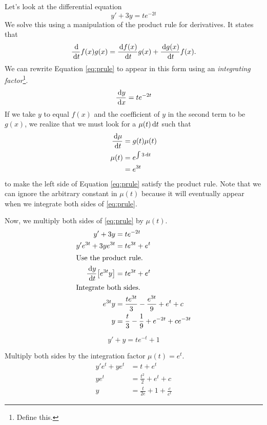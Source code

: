 \begin{ex}
  Let's look at the differential equation
  \begin{equation}
    y'+3y=te^{-2t}
    \label{eq:prule}
  \end{equation}
  We solve this using a manipulation of the product rule for derivatives.
  It states that
  \begin{equation}
    \frac{\,\mathrm{d}}{\,\mathrm{d} t} f(x) g(x)= \frac{\,\mathrm{d} f(x)}{\,\mathrm{d} t} g(x) + \frac{\,\mathrm{d} g(x)}{\,\mathrm{d} t} f(x).
  \end{equation}
  We can rewrite Equation \eqref{eq:prule} to appear in this form using an \emph{integrating factor}\footnote{Define this.}.
  \[ \frac{\,\mathrm{d} y}{\,\mathrm{d} x}= t e^{-2t} \]
  If we take $y$ to equal $f(x)$ and the coefficient of $y$ in the second term to be $g(x)$, we realize that we must look for a $\mu (t) \,\mathrm{d} t$ such that
  \begin{align*}
    \frac{\,\mathrm{d} \mu}{\,\mathrm{d} t} &= g(t) \mu(t) \\
    \mu (t) &= e^{\int 3 \,\mathrm{d} t}\\
    &=e^{3t}
  \end{align*}
  to make the left side of Equation \eqref{eq:prule} satisfy the product rule.
  Note that we can ignore the arbitrary constant in $\mu (t)$ because it will eventually appear when we integrate both sides of \eqref{eq:prule}.

  Now, we multiply both sides of \eqref{eq:prule} by $\mu (t)$.
  \begin{align*}
    y'+3y &= te^{-2t} \\
    y' e^{3t} +3ye^{3t} &= te^{3t}+e^t \\
    \intertext{Use the product rule.}
    \frac{\,\mathrm{d} y}{\,\mathrm{d} t} \big[e^{3t}y\big] &=  te^{3t}+e^t \\
    \intertext{Integrate both sides.}
    e^{3t}y&=\frac{te^{3t}}{3}-\frac{e^{3t}}{9}+e^t+c\\
    y &=\frac{t}{3}-\frac{1}{9}+e^{-2t}+ce^{-3t}
  \end{align*}
\end{ex}
\begin{ex}
  \[y' +y = t e^{-t}+1\]
  \begin{sol}
    Multiply both sides by the integration factor $\mu (t) = e^t$.
    \begin{align*}
      y'e^t +ye^t &= t +e^t \\
      y e^t &= \frac{t^2}{2}+e^t+c \\
      y &= \frac{t}{2e}+1+\frac{c}{e^t}
    \end{align*}
  \end{sol}
\end{ex}
